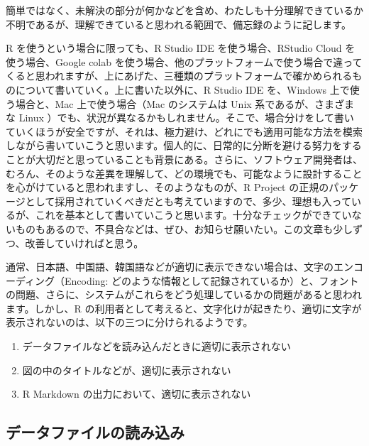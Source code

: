 \documentclass[
  xelatex, ja=standard]{bxjsbook}
\providecommand{\tightlist}{%
  \setlength{\itemsep}{0pt}\setlength{\parskip}{0pt}}
\theoremstyle{definition}
\theoremstyle{definition}
\theoremstyle{definition}
\theoremstyle{definition}
\theoremstyle{remark}
\begin{document}
簡単ではなく、未解決の部分が何かなどを含め、わたしも十分理解できているか不明であるが、理解できていると思われる範囲で、備忘録のように記します。

R を使うという場合に限っても、R Studio IDE を使う場合、RStudio Cloud を使う場合、Google colab を使う場合、他のプラットフォームで使う場合で違ってくると思われますが、上にあげた、三種類のプラットフォームで確かめられるものについて書いていく。上に書いた以外に、R Studio IDE を、Windows 上で使う場合と、Mac 上で使う場合（Mac のシステムは Unix 系であるが、さまざまな Linux ）でも、状況が異なるかもしれません。そこで、場合分けをして書いていくほうが安全ですが、それは、極力避け、どれにでも適用可能な方法を模索しながら書いていこうと思います。個人的に、日常的に分断を避ける努力をすることが大切だと思っていることも背景にある。さらに、ソフトウェア開発者は、むろん、そのような差異を理解して、どの環境でも、可能なように設計することを心がけていると思われますし、そのようなものが、R Project の正規のパッケージとして採用されていくべきだとも考えていますので、多少、理想も入っているが、これを基本として書いていこうと思います。十分なチェックができていないものもあるので、不具合などは、ぜひ、お知らせ願いたい。この文章も少しずつ、改善していければと思う。

通常、日本語、中国語、韓国語などが適切に表示できない場合は、文字のエンコーディング（Encoding: どのような情報として記録されているか）と、フォントの問題、さらに、システムがこれらをどう処理しているかの問題があると思われます。しかし、R の利用者として考えると、文字化けが起きたり、適切に文字が表示されないのは、以下の三つに分けられるようです。

\begin{enumerate}
\def\labelenumi{\arabic{enumi}.}
\tightlist
\item
  データファイルなどを読み込んだときに適切に表示されない
\item
  図の中のタイトルなどが、適切に表示されない
\item
  R Markdown の出力において、適切に表示されない
\end{enumerate}

\hypertarget{ux30c7ux30fcux30bfux30d5ux30a1ux30a4ux30ebux306eux8aadux307fux8fbcux307f}{%
\subsection{データファイルの読み込み}\label{ux30c7ux30fcux30bfux30d5ux30a1ux30a4ux30ebux306eux8aadux307fux8fbcux307f}}
\end{document}
